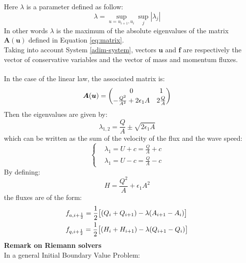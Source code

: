 \documentclass[12pt,a4paper]{article}
\numberwithin{equation}{section}
\begin{document}
Here $\lambda$ is a parameter defined as follow:
\begin{equation}
\lambda = \sup_{u = u_{i+1}, u_{i}} \sup_j |\lambda_j|
\end{equation}
In other words $\lambda$ is the maximum of the absolute eigenvalues of the matrix $\boldsymbol{A}(\boldsymbol{u})$ defined in Equation \ref{eq:matrix}.\\
Taking into account System \ref{adim-system}, vectors $\boldsymbol{u}$ and $\boldsymbol{f}$ are respectively the vector of conservative variables and the vector of
mass and momentum fluxes.\\
\\
In the case of the linear law, the associated matrix is:
\begin{equation}
\boldsymbol{A}(\boldsymbol{u}) = 
\begin{matrix}
\begin{pmatrix}
0 & 1  \\
-{Q^2 \over A^2} + 2\epsilon_1 A & 2{Q \over A} \\
\end{pmatrix}
\end{matrix}
\end{equation}
Then the eigenvalues are given by:
\begin{equation}
\lambda_{1,2} = \frac{Q}{A} \pm \sqrt{2\epsilon_1 A}
\end{equation}
which can be written as the sum of the velocity of the flux and the wave speed:
\begin{equation*}
	\left\{
      \begin{aligned}
       & \lambda_1 = U + c = \frac{Q}{A} + c\\
       & \lambda_1 = U - c = \frac{Q}{A} - c
      \end{aligned}
    \right.
\end{equation*}
By defining:
\begin{equation} \label{eq:H}
H = \frac{Q^2}{A} + \epsilon_1 A^2
\end{equation}
the fluxes are of the form:
\begin{align}
\label{eq:f_a}
& f_{a, i+{1\over 2}} = {1\over 2}\big[(Q_{i} + Q_{i+1}) - \lambda(A_{i+1} - A_i)\big] \\
\label{eq:f_q}
& f_{q, i+{1\over 2}} = {1\over 2}\big[(H_i +H_{i+1}) - \lambda(Q_{i+1} - Q_i)\big]
\end{align}
\baselineskip
\noindent
{\bf Remark on Riemann solvers}\\
In a general Initial Boundary Value Problem:
\end{document}
